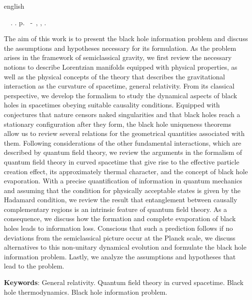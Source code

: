 \documentclass[
12pt,		%
openright,	%
twoside,  %
a4paper,			%
chapter=TITLE,		%
english,			%
french,				%
spanish,			%
brazil				%
]{USPSC-classe/USPSC}
\begin{document}
\begin{resumo}[Abstract]
 \begin{otherlanguage*}{english}
	\begin{flushleft} 
		\setlength{\absparsep}{0pt} %
 		\SingleSpacing  		\imprimirautorabr~~\textbf{\imprimirtitleabstract}.	\imprimirdata.  \pageref{LastPage}p. 
		\imprimirtipotrabalhoabs~-~\imprimirinstituicao, \imprimirlocal, 	\imprimirdata. 
 	\end{flushleft}
	\OnehalfSpacing 
The aim of this work is to present the black hole information problem and discuss the assumptions and hypotheses necessary for its formulation. As the problem arises in the framework of semiclassical gravity, we first review the necessary notions to describe Lorentzian manifolds equipped with physical properties, as well as the physical concepts of the theory that describes the gravitational interaction as the curvature of spacetime, general relativity. From its classical perspective, we develop the formalism to study the dynamical aspects of black holes in spacetimes obeying suitable causality conditions. Equipped with conjectures that nature censors naked singularities and that black holes reach a stationary configuration after they form, the black hole uniqueness theorems allow us to review several relations for the geometrical quantities associated with them. Following considerations of the other fundamental interactions, which are described by quantum field theory, we review the arguments in the formalism of quantum field theory in curved spacetime that give rise to the effective particle creation effect, its approximately thermal character, and the concept of black hole evaporation. With a precise quantification of information in quantum mechanics and assuming that the condition for physically acceptable states is given by the Hadamard condition, we review the result that entanglement between causally complementary regions is an intrinsic feature of quantum field theory. As a consequence, we discuss how the formation and complete evaporation of black holes leads to information loss. Conscious that such a prediction follows if no deviations from the semiclassical picture occur at the Planck scale, we discuss alternatives to this non-unitary dynamical evolution and formulate the black hole information problem. Lastly, we analyze the assumptions and hypotheses that lead to the problem.



   \vspace{\onelineskip}
 
   \noindent 
   \textbf{Keywords}: General relativity. Quantum field theory in curved spacetime.  Black hole thermodynamics. Black hole information problem.
 \end{otherlanguage*}
\end{resumo}
\end{document}
